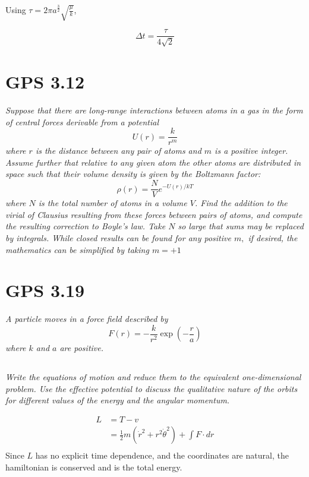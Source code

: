 \documentclass{article}
\begin{document}
Using $\tau=2 \pi a^{\frac{3}{2}} \sqrt{\frac{\mu}{k}}$,

$$\boxed{\Delta t=\frac{\tau}{4 \sqrt{2}}}$$

\newpage



\section{GPS 3.12}
\textit{Suppose that there are long-range interactions between atoms in a gas in the form of central forces derivable from a potential
$$
U(r)=\frac{k}{r^{m}}
$$
where $r$ is the distance between any pair of atoms and $m$ is a positive integer. Assume further that relative to any given atom the other atoms are distributed in space such that their volume density is given by the Boltzmann factor:
$$
\rho(r)=\frac{N}{V} e^{-U(r) / k T}
$$
where $N$ is the total number of atoms in a volume $V$. Find the addition to the virial of Clausius resulting from these forces between pairs of atoms, and compute the resulting correction to Boyle's law. Take $N$ so large that sums may be replaced by integrals. While closed results can be found for any positive $m,$ if desired, the mathematics can be simplified by taking $m=+1$}
\newpage


\section{GPS 3.19}
\textit{A particle moves in a force field described by
$$
F(r)=-\frac{k}{r^{2}} \exp \left(-\frac{r}{a}\right)
$$
where $k$ and $a$ are positive.}


\subsection{}
\textit{Write the equations of motion and reduce them to the equivalent one-dimensional problem. Use the effective potential to discuss the qualitative nature of the orbits for different values of the energy and the angular momentum.}

\begin{align*}
    L &= T - v \\
     &= \frac{1}{2} m\left(\dot{r}^{2}+r^{2} \dot{\theta}^{2}\right)+\int F \cdot d r\\
\end{align*}
Since $L$ has no explicit time dependence, and the coordinates are natural, the hamiltonian is conserved and is the total energy. 
\end{document}
